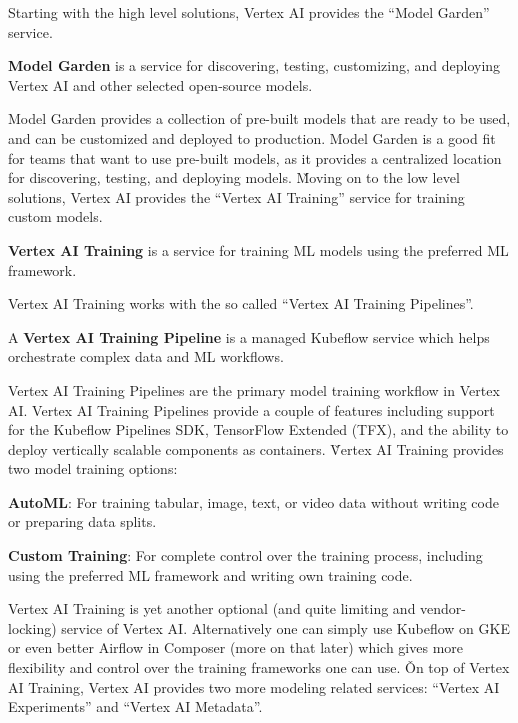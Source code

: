 Starting with the high level solutions, Vertex AI provides the ``Model Garden'' service.

\textbf{Model Garden} is a service for discovering, testing, customizing, and deploying Vertex AI and other selected
open-source models.
\ed

Model Garden provides a collection of pre-built models that are ready to be used, and can be customized and deployed
to production. Model Garden is a good fit for teams that want to use pre-built models, as it provides a centralized
location for discovering, testing, and deploying models. \v

Moving on to the low level solutions, Vertex AI provides the ``Vertex AI Training'' service for training custom models.

\textbf{Vertex AI Training} is a service for training ML models using the preferred ML framework.
\ed

Vertex AI Training works with the so called ``Vertex AI  Training Pipelines''.

A \textbf{Vertex AI Training Pipeline} is a managed Kubeflow service which helps orchestrate complex data and ML
workflows.
\ed

Vertex AI Training Pipelines are the primary model training workflow in Vertex AI\@. Vertex AI Training Pipelines
provide a couple of features including support for the Kubeflow Pipelines SDK, TensorFlow Extended (TFX), and the
ability to deploy vertically scalable components as containers. \v

Vertex AI Training provides two model training options:
\bit
\item \textbf{AutoML}: For training tabular, image, text, or video data without writing code or preparing data splits.
\item \textbf{Custom Training}: For complete control over the training process, including using the preferred ML
framework and writing own training code.
\eit

Vertex AI Training is yet another optional (and quite limiting and vendor-locking) service of Vertex AI. Alternatively
one can simply use Kubeflow on GKE or even better Airflow in Composer (more on that later) which gives more flexibility
and control over the training frameworks one can use. \v

On top of Vertex AI Training, Vertex AI provides two more modeling related services: ``Vertex AI Experiments'' and
``Vertex AI Metadata''.


